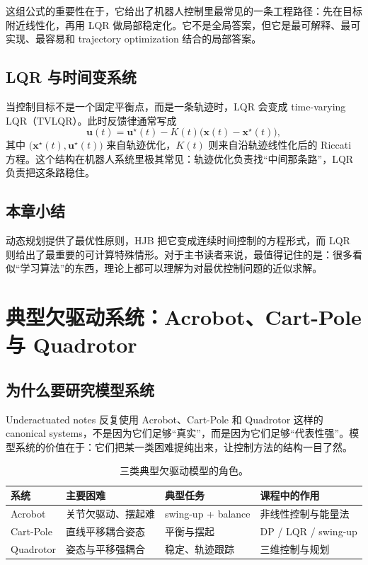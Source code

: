 \documentclass[a4paper]{article}
\newcommand{\bx}{\mathbf{x}}
\newcommand{\bu}{\mathbf{u}}
\begin{document}
这组公式的重要性在于，它给出了机器人控制里最常见的一条工程路径：先在目标附近线性化，再用 LQR 做局部稳定化。它不是全局答案，但它是最可解释、最可实现、最容易和 trajectory optimization 结合的局部答案。

\subsection{LQR 与时间变系统}

当控制目标不是一个固定平衡点，而是一条轨迹时，LQR 会变成 time-varying LQR（TVLQR）。此时反馈律通常写成
\[
\bu(t) = \bu^\star(t) - K(t)\big(\bx(t)-\bx^\star(t)\big),
\]
其中 $\big(\bx^\star(t),\bu^\star(t)\big)$ 来自轨迹优化，$K(t)$ 则来自沿轨迹线性化后的 Riccati 方程。这个结构在机器人系统里极其常见：轨迹优化负责找“中间那条路”，LQR 负责把这条路稳住。

\subsection{本章小结}

动态规划提供了最优性原则，HJB 把它变成连续时间控制的方程形式，而 LQR 则给出了最重要的可计算特殊情形。对于主书读者来说，最值得记住的是：很多看似“学习算法”的东西，理论上都可以理解为对最优控制问题的近似求解。

\section{典型欠驱动系统：Acrobot、Cart-Pole 与 Quadrotor}

\subsection{为什么要研究模型系统}

Underactuated notes 反复使用 Acrobot、Cart-Pole 和 Quadrotor 这样的 canonical systems，不是因为它们足够“真实”，而是因为它们足够“代表性强”。模型系统的价值在于：它们把某一类困难提纯出来，让控制方法的结构一目了然。

\begin{table}[H]
\centering
\begin{tabular}{@{}llll@{}}
\toprule
系统 & 主要困难 & 典型任务 & 课程中的作用 \\
\midrule
Acrobot & 关节欠驱动、摆起难 & swing-up + balance & 非线性控制与能量法 \\
Cart-Pole & 直线平移耦合姿态 & 平衡与摆起 & DP / LQR / swing-up \\
Quadrotor & 姿态与平移强耦合 & 稳定、轨迹跟踪 & 三维控制与规划 \\
\bottomrule
\end{tabular}
\caption{三类典型欠驱动模型的角色。}
\end{table}
\end{document}
